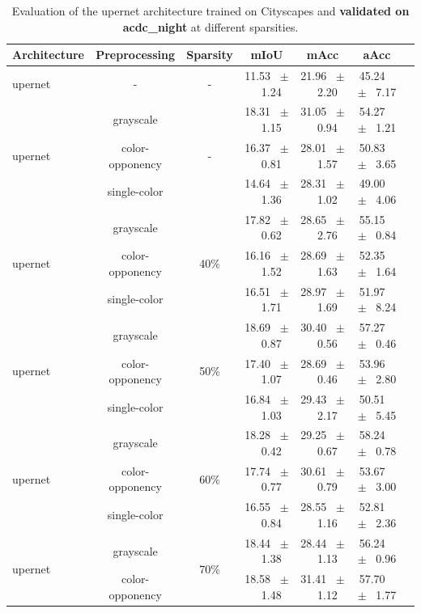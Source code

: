 \begin{table}[h]
  \centering
  \caption{Evaluation of the upernet architecture trained on Cityscapes and \textbf{validated on acdc_night} at different sparsities.}
  \begin{tabular}{@{}lccc ccc@{}}
    \toprule
    Architecture & Preprocessing & Sparsity & mIoU & mAcc & aAcc \\
    \midrule
    upernet & - & - & 11.53 ~$\pm$~ 1.24 & 21.96 ~$\pm$~ 2.20 & 45.24 ~$\pm$~ 7.17 \\
    \midrule
    \midrule
    \multirow{3}{*}{upernet} & grayscale & \multirow{3}{*}{-} & 18.31 ~$\pm$~ 1.15 & 31.05 ~$\pm$~ 0.94 & 54.27 ~$\pm$~ 1.21 \\
    & color-opponency & & 16.37 ~$\pm$~ 0.81 & 28.01 ~$\pm$~ 1.57 & 50.83 ~$\pm$~ 3.65 \\
    & single-color & & 14.64 ~$\pm$~ 1.36 & 28.31 ~$\pm$~ 1.02 & 49.00 ~$\pm$~ 4.06 \\
    \midrule
    \multirow{3}{*}{upernet} & grayscale & \multirow{3}{*}{40\%} & 17.82 ~$\pm$~ 0.62 & 28.65 ~$\pm$~ 2.76 & 55.15 ~$\pm$~ 0.84 \\
    & color-opponency & & 16.16 ~$\pm$~ 1.52 & 28.69 ~$\pm$~ 1.63 & 52.35 ~$\pm$~ 1.64 \\
    & single-color & & 16.51 ~$\pm$~ 1.71 & 28.97 ~$\pm$~ 1.69 & 51.97 ~$\pm$~ 8.24 \\
    \midrule
    \multirow{3}{*}{upernet} & grayscale & \multirow{3}{*}{50\%} & 18.69 ~$\pm$~ 0.87 & 30.40 ~$\pm$~ 0.56 & 57.27 ~$\pm$~ 0.46 \\
    & color-opponency & & 17.40 ~$\pm$~ 1.07 & 28.69 ~$\pm$~ 0.46 & 53.96 ~$\pm$~ 2.80 \\
    & single-color & & 16.84 ~$\pm$~ 1.03 & 29.43 ~$\pm$~ 2.17 & 50.51 ~$\pm$~ 5.45 \\
    \midrule
    \multirow{3}{*}{upernet} & grayscale & \multirow{3}{*}{60\%} & 18.28 ~$\pm$~ 0.42 & 29.25 ~$\pm$~ 0.67 & 58.24 ~$\pm$~ 0.78 \\
    & color-opponency & & 17.74 ~$\pm$~ 0.77 & 30.61 ~$\pm$~ 0.79 & 53.67 ~$\pm$~ 3.00 \\
    & single-color & & 16.55 ~$\pm$~ 0.84 & 28.55 ~$\pm$~ 1.16 & 52.81 ~$\pm$~ 2.36 \\
    \midrule
    \multirow{3}{*}{upernet} & grayscale & \multirow{3}{*}{70\%} & 18.44 ~$\pm$~ 1.38 & 28.44 ~$\pm$~ 1.13 & 56.24 ~$\pm$~ 0.96 \\
    & color-opponency & & 18.58 ~$\pm$~ 1.48 & 31.41 ~$\pm$~ 1.12 & 57.70 ~$\pm$~ 1.77 \\

\end{tabular}
\end{table}
